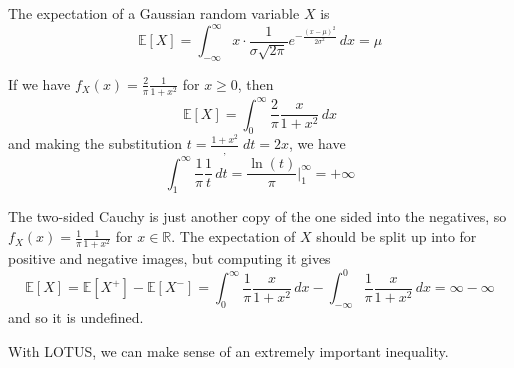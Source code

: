 \documentclass{article}
\begin{document}
      \begin{example}
        The expectation of a Gaussian random variable $X$ is
        \begin{equation}
          \mathbb{E}[X] = \int_{-\infty}^\infty x \cdot \frac{1}{\sigma \sqrt{2\pi}} e^{-\frac{(x - \mu)^2}{2 \sigma^2}} \, dx = \mu
        \end{equation}
      \end{example}

      \begin{example}
        If we have $f_X (x) = \frac{2}{\pi} \frac{1}{1 + x^2}$ for $x \geq 0$, then 
        \begin{equation}
          \mathbb{E}[X] = \int_0^\infty \frac{2}{\pi} \frac{x}{1 + x^2} \,dx
        \end{equation}
        and making the substitution $t = \frac{1 + x^2}, \; dt = 2x$, we have 
        \begin{equation}
          \int_1^\infty \frac{1}{\pi} \frac{1}{t} \,dt = \frac{\ln(t)}{\pi} \bigg|_1^\infty = +\infty
        \end{equation}
      \end{example}

      \begin{example}
        The two-sided Cauchy is just another copy of the one sided into the negatives, so $f_X (x) = \frac{1}{\pi} \frac{1}{1 + x^2}$ for $x \in \mathbb{R}$. The expectation of $X$ should be split up into for positive and negative images, but computing it gives 
        \begin{equation}
          \mathbb{E}[X] = \mathbb{E}[X^+] - \mathbb{E}[X^-] = \int_0^\infty \frac{1}{\pi} \frac{x}{1 + x^2}\,dx - \int_{-\infty}^0 \frac{1}{\pi} \frac{x}{1 + x^2}\,dx = \infty - \infty
        \end{equation}
        and so it is undefined. 
      \end{example}

      With LOTUS, we can make sense of an extremely important inequality. 
\end{document}
